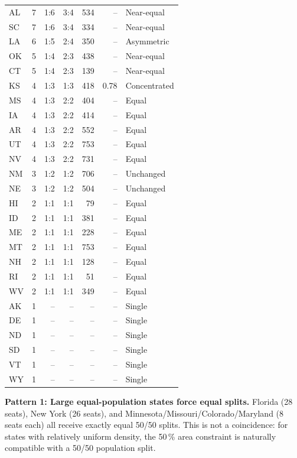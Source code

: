 \begin{table}[h]
\begin{tabular}{llrrrrl}
AL  &  7 & 1:6  & 3:4   & 534 & -- & Near-equal \\
SC  &  7 & 1:6  & 3:4   & 334 & -- & Near-equal \\
LA  &  6 & 1:5  & 2:4   & 350 & -- & Asymmetric \\
OK  &  5 & 1:4  & 2:3   & 438 & -- & Near-equal \\
CT  &  5 & 1:4  & 2:3   & 139 & -- & Near-equal \\
KS  &  4 & 1:3  & 1:3   & 418 & 0.78 & Concentrated \\
MS  &  4 & 1:3  & 2:2   & 404 & -- & Equal \\
IA  &  4 & 1:3  & 2:2   & 414 & -- & Equal \\
AR  &  4 & 1:3  & 2:2   & 552 & -- & Equal \\
UT  &  4 & 1:3  & 2:2   & 753 & -- & Equal \\
NV  &  4 & 1:3  & 2:2   & 731 & -- & Equal \\
NM  &  3 & 1:2  & 1:2   & 706 & -- & Unchanged \\
NE  &  3 & 1:2  & 1:2   & 504 & -- & Unchanged \\
HI  &  2 & 1:1  & 1:1   & 79  & -- & Equal \\
ID  &  2 & 1:1  & 1:1   & 381 & -- & Equal \\
ME  &  2 & 1:1  & 1:1   & 228 & -- & Equal \\
MT  &  2 & 1:1  & 1:1   & 753 & -- & Equal \\
NH  &  2 & 1:1  & 1:1   & 128 & -- & Equal \\
RI  &  2 & 1:1  & 1:1   & 51  & -- & Equal \\
WV  &  2 & 1:1  & 1:1   & 349 & -- & Equal \\
AK  &  1 & --   & --    & --  & -- & Single \\
DE  &  1 & --   & --    & --  & -- & Single \\
ND  &  1 & --   & --    & --  & -- & Single \\
SD  &  1 & --   & --    & --  & -- & Single \\
VT  &  1 & --   & --    & --  & -- & Single \\
WY  &  1 & --   & --    & --  & -- & Single \\
\bottomrule
\end{tabular}
\end{table}

\noindent\textbf{Pattern 1: Large equal-population states force equal splits.}
Florida (28 seats), New York (26 seats), and Minnesota/Missouri/Colorado/Maryland
(8 seats each) all receive exactly equal 50/50 splits.
This is not a coincidence: for states with relatively uniform density, the
50\,\% area constraint is naturally compatible with a 50/50 population split.

